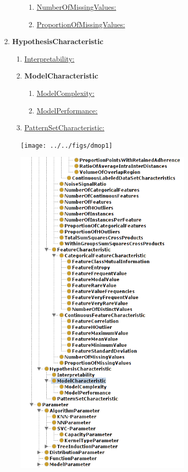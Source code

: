 \documentclass[a4paper,12pt, english]{article}
\begin{document}
\begin{enumerate}
\begin{enumerate}
\begin{enumerate}
		\item \underline{NumberOfMissingValues:}
		\item \underline{ProportionOfMissingValues:}
		\end{enumerate}
	\end{enumerate}
\item \textbf{HypothesisCharacteristic}
	\begin{enumerate}
	\item \underline{Interpretability:}
	\item \textbf{ModelCharacteristic}
		\begin{enumerate}
		\item \underline{ModelComplexity:}
		\item \underline{ModelPerformance:}
		\end{enumerate}	
	\item \underline{PatternSetCharacteristic:}
	\end{enumerate}	
\end{enumerate}
\newpage

\begin{figure}[h]   
  \centering 
  \texttt{[image: ../../figs/dmop1]}
  \caption{}
  \label{fig:dmop1}
\end{figure}

\begin{figure}[h]   
  \centering 
  \includegraphics[width=0.75\textwidth]{../figs/dmop2}
  \caption{}
  \label{fig:dmop2}
\end{figure}
\end{document}
